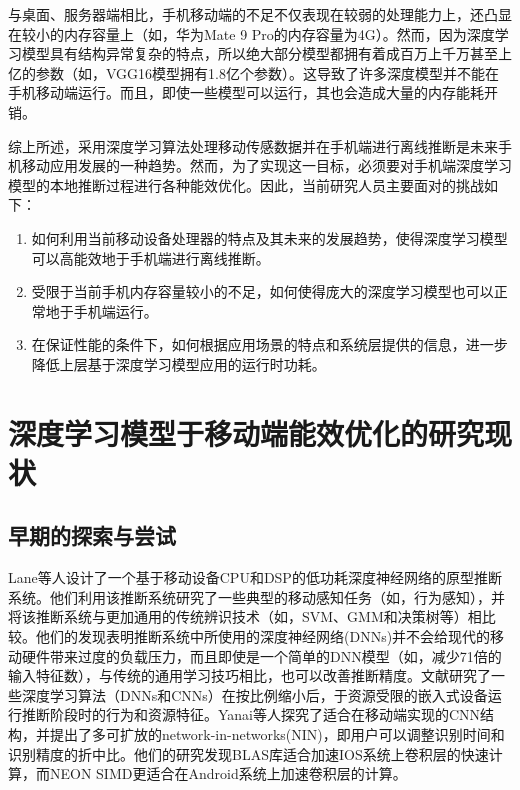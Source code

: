 与桌面、服务器端相比，手机移动端的不足不仅表现在较弱的处理能力上，还凸显在较小的内存容量上（如，华为Mate 9 Pro的内存容量为4G）。然而，因为深度学习模型具有结构异常复杂的特点，所以绝大部分模型都拥有着成百万上千万甚至上亿的参数（如，VGG16模型拥有1.8亿个参数）。这导致了许多深度模型并不能在手机移动端运行。而且，即使一些模型可以运行，其也会造成大量的内存能耗开销。

综上所述，采用深度学习算法处理移动传感数据并在手机端进行离线推断是未来手机移动应用发展的一种趋势。然而，为了实现这一目标，必须要对手机端深度学习模型的本地推断过程进行各种能效优化。因此，当前研究人员主要面对的挑战如下：

\begin{enumerate}
\item  如何利用当前移动设备处理器的特点及其未来的发展趋势，使得深度学习模型可以高能效地于手机端进行离线推断。
\item 受限于当前手机内存容量较小的不足，如何使得庞大的深度学习模型也可以正常地于手机端运行。
\item 在保证性能的条件下，如何根据应用场景的特点和系统层提供的信息，进一步降低上层基于深度学习模型应用的运行时功耗。
\end{enumerate}

\section{深度学习模型于移动端能效优化的研究现状}
\subsection{早期的探索与尝试}
Lane等人\cite{lane2015can}设计了一个基于移动设备CPU和DSP的低功耗深度神经网络的原型推断系统。他们利用该推断系统研究了一些典型的移动感知任务（如，行为感知），并将该推断系统与更加通用的传统辨识技术（如，SVM、GMM和决策树等）相比较。他们的发现表明推断系统中所使用的深度神经网络(DNNs)并不会给现代的移动硬件带来过度的负载压力，而且即使是一个简单的DNN模型（如，减少71倍的输入特征数），与传统的通用学习技巧相比，也可以改善推断精度。文献\cite{lane2015early}研究了一些深度学习算法（DNNs和CNNs）在按比例缩小后，于资源受限的嵌入式设备运行推断阶段时的行为和资源特征。Yanai等人\cite{yanai2016efficient}探究了适合在移动端实现的CNN结构，并提出了多可扩放的network-in-networks(NIN)，即用户可以调整识别时间和识别精度的折中比。他们的研究发现BLAS库适合加速IOS系统上卷积层的快速计算，而NEON SIMD更适合在Android系统上加速卷积层的计算。
